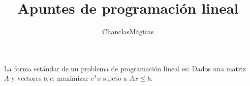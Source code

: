 \documentclass{article}
\title{Apuntes de programación lineal}
\author{ChanclasMágicas}
\begin{document}
\maketitle

La forma estándar de un problema de programación lineal es:
Dados una matriz $A$ y vectores $b,c$, maximizar $c^Tx$ sujeto a
$Ax\leq b$.
\end{document}
